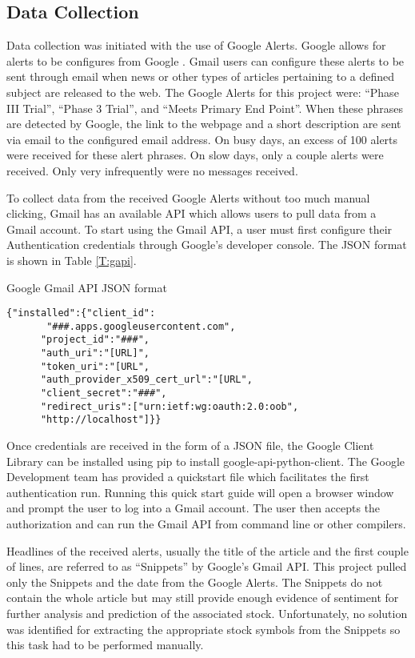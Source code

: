 \documentclass[sigconf]{acmart}
\begin{document}
\subsection{Data Collection}
Data collection was initiated with the use of Google Alerts. Google allows for alerts to be configures from Google \cite{www-googleAlerts}. Gmail users can configure these alerts to be sent through email when news or other types of articles pertaining to a defined subject are released to the web. The Google Alerts for this project were: ``Phase III Trial'', ``Phase 3 Trial'', and ``Meets Primary End Point''. When these phrases are detected by Google, the link to the webpage and a short description are sent via email to the configured email address. On busy days, an excess of 100 alerts were received for these alert phrases. On slow days, only a couple alerts were received.  Only very infrequently were no messages received. 

To collect data from the received Google Alerts without too much manual clicking, Gmail has an available API which allows users to pull data from a Gmail account. To start using the Gmail API, a user must first configure their Authentication credentials through Google's developer console. The JSON format is shown in Table \ref{T:gapi}.
\begin{table}[htb]
\caption{Google Gmail API JSON format}\label{T:gapi}
\begin{verbatim}
{"installed":{"client_id":
       "###.apps.googleusercontent.com",
      "project_id":"###",
      "auth_uri":"[URL]",
      "token_uri":"[URL",
      "auth_provider_x509_cert_url":"[URL",
      "client_secret":"###",
      "redirect_uris":["urn:ietf:wg:oauth:2.0:oob",
      "http://localhost"]}}
\end{verbatim}
\end{table}
Once credentials are received in the form of a JSON file, the Google Client Library can be installed using pip to install google-api-python-client. The Google Development team has provided a quickstart file which facilitates the first authentication run. Running this quick start guide will open a browser window and prompt the user to log into a Gmail account. The user then accepts the authorization and can run the Gmail API from command line or other compilers. 

 Headlines of the received alerts, usually the title of the article and the first couple of lines, are referred to as ``Snippets'' by Google's Gmail API. This project pulled only the Snippets and the date from the Google Alerts. The Snippets do not contain the whole article but may still provide enough evidence of sentiment for further analysis and prediction of the associated stock. Unfortunately, no solution was identified for extracting the appropriate stock symbols from the Snippets so this task had to be performed manually. 
\end{document}
